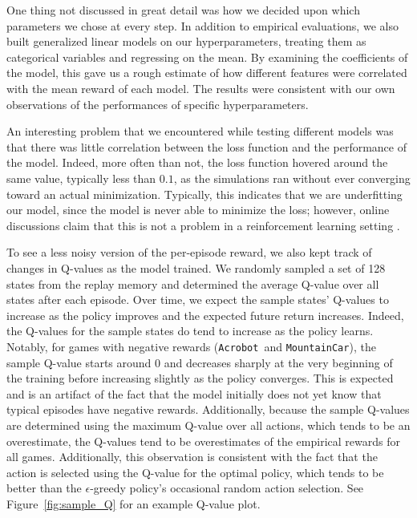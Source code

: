 \documentclass[11pt]{article}
\newcommand{\ab}{\texttt{Acrobot}}
\newcommand{\mc}{\texttt{MountainCar}}
\begin{document}
One thing not discussed in great detail was how we decided upon which parameters we chose at every step. In addition to empirical evaluations, we also built generalized linear models on our hyperparameters, treating them as categorical variables and regressing on the mean. By examining the coefficients of the model, this gave us a rough estimate of how different features were correlated with the mean reward of each model. The results were consistent with our own observations of the performances of specific hyperparameters.

An interesting problem that we encountered while testing different models was that there was little correlation between the loss function and the performance of the model. Indeed, more often than not, the loss function hovered around the same value, typically less than $0.1$, as the simulations ran without ever converging toward an actual minimization. Typically, this indicates that we are underfitting our model, since the model is never able to minimize the loss; however, online discussions claim that this is not a problem in a reinforcement learning setting \cite{stackexchange2017loss}.

To see a less noisy version of the per-episode reward, we also kept track of changes in Q-values as the model trained. We randomly sampled a set of 128 states from the replay memory and determined the average Q-value over all states after each episode. Over time, we expect the sample states' Q-values to increase as the policy improves and the expected future return increases. Indeed, the Q-values for the sample states do tend to increase as the policy learns. Notably, for games with negative rewards (\ab~and \mc), the sample Q-value starts around 0 and decreases sharply at the very beginning of the training before increasing slightly as the policy converges. This is expected and is an artifact of the fact that the model initially does not yet know that typical episodes have negative rewards. Additionally, because the sample Q-values are determined using the maximum Q-value over all actions, which tends to be an overestimate, the Q-values tend to be overestimates of the empirical rewards for all games. Additionally, this observation is consistent with the fact that the action is selected using the Q-value for the optimal policy, which tends to be better than the $\epsilon$-greedy policy's occasional random action selection. See Figure~\ref{fig:sample_Q} for an example Q-value plot.
\end{document}
